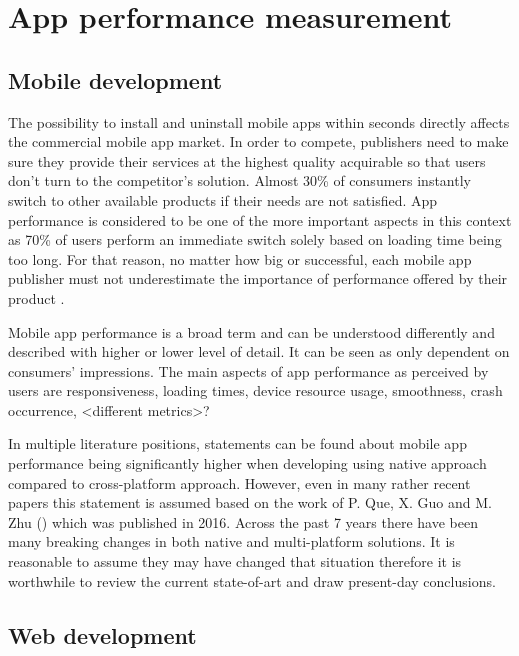 
\chapter{App performance measurement}

\section{Mobile development}

The possibility to install and uninstall mobile apps within seconds directly affects the commercial mobile app market. In order to compete, publishers need to make sure they provide their services at the highest quality acquirable so that users don't turn to the competitor's solution. Almost 30\% of consumers instantly switch to other available products if their needs are not satisfied. App performance is considered to be one of the more important aspects in this context as 70\% of users perform an immediate switch solely based on loading time being too long. For that reason, no matter how big or successful, each mobile app publisher must not underestimate the importance of performance offered by their product \cite{micro_moments_guide}. 

Mobile app performance is a broad term and can be understood differently and described with higher or lower level of detail. It can be seen as only dependent on consumers' impressions. The main aspects of app performance as perceived by users are responsiveness, loading times, device resource usage, smoothness, crash occurrence, <different metrics>?

In multiple literature positions, statements can be found about mobile app performance being significantly higher when developing using native approach compared to cross-platform approach. However, even in many rather recent papers this statement is assumed based on the work of P. Que, X. Guo and M. Zhu (\cite{que_comp_hybrid_native}) which was published in 2016. Across the past 7 years there have been many breaking changes in both native and multi-platform solutions. It is reasonable to assume they may have changed that situation therefore it is worthwhile to review the current state-of-art and draw present-day conclusions.

\section{Web development}
